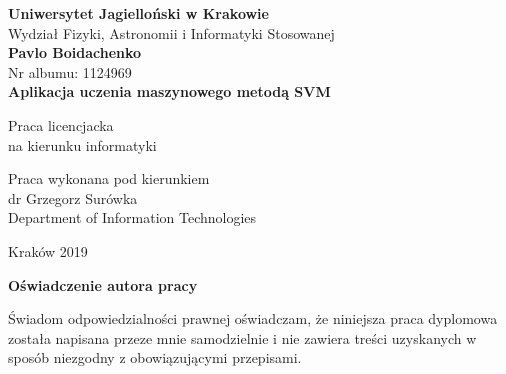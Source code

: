 \documentclass[paper=a4, fontsize=11pt]{scrartcl} %
\def \thesis {Aplikacja uczenia maszynowego metodą SVM}
\def \author {Pavlo Boidachenko}
\def \department {Wydział Fizyki, Astronomii i Informatyki Stosowanej}
\numberwithin{equation}{section} %
\numberwithin{figure}{section} %
\begin{document}
\thispagestyle{empty}
\begin{titlepage}
    \begin{center}
        \Large \textbf{Uniwersytet Jagielloński w Krakowie}\vspace{0.2cm}\\ \department\\
        \vspace*{1cm} 
        \vspace{3cm}
        \Large
        \textbf{\author}\\\vspace{0.5cm}
        \normalsize Nr albumu: 1124969\\
        \vspace{2cm}
        \Huge
        \textbf{\thesis}

        \vspace{1.5cm}
        \normalsize
        Praca licencjacka\\
        na kierunku informatyki\\ \vspace{0.15cm}
        \vfill
        \vspace{2cm}
        \begin{minipage}{1\textwidth}
            \begin{flushright}
                Praca wykonana pod kierunkiem\\
                dr Grzegorz Surówka\\
                Department of Information Technologies
            \end{flushright}
        \end{minipage}
        \vspace{2cm}
        \begin{center}
            Kraków 2019
        \end{center}
    \end{center}

\end{titlepage}

\newpage 
 \thispagestyle{empty}
\vspace{2.5cm}
\begin{flushleft}
\large \textbf{Oświadczenie autora pracy}\vspace{0.6cm}\\
\end{flushleft}

\noindent Świadom odpowiedzialności prawnej oświadczam, że niniejsza praca dyplomowa została napisana przeze mnie samodzielnie i nie zawiera treści uzyskanych w sposób niezgodny z obowiązującymi przepisami.\\
\end{document}

